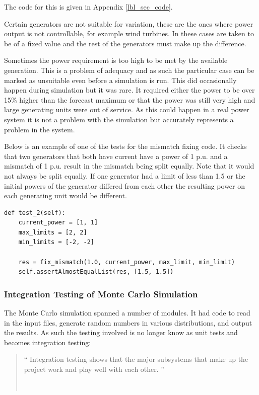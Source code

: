 \documentclass[a4paper,oneside,12pt]{report}
\newcommand{\tmpquotecite}{}%
\newenvironment{myquote}[1][]
{\renewcommand{\tmpquotecite}{#1}\begin{quote}\begin{itshape}``}
{''\end{itshape}~{\normalfont~\tmpquotecite}\end{quote}}
\begin{document}
The code for this is given in Appendix \ref{lbl_sec_code}.

Certain generators are not suitable for variation, these are the ones
where power output is not controllable, for example wind turbines. In
these cases are taken to be of a fixed value and the rest of the
generators must make up the difference.

Sometimes the power requirement is too high to be met by the available
generation. This is a problem of adequacy and as such the particular
case can be marked as unsuitable even before a simulation is run. This
did occasionally happen during simulation but it was rare. It required
either the power to be over 15\% higher than the forecast maximum or
that the power was still very high and large generating units were out
of service. As this could happen in a real power system it is not a
problem with the simulation but accurately represents a problem in the
system.

Below is an example of one of the tests for the mismatch fixing code. It
checks that two generators that both have current have a power of 1 p.u.
and a mismatch of 1 p.u. result in the mismatch being split equally.
Note that it would not always be split equally. If one generator had a
limit of less than 1.5 or the initial powers of the generator differed
from each other the resulting power on each generating unit would be
different.

\begin{verbatim}
def test_2(self):
    current_power = [1, 1]
    max_limits = [2, 2]
    min_limits = [-2, -2]

    res = fix_mismatch(1.0, current_power, max_limit, min_limit)
    self.assertAlmostEqualList(res, [1.5, 1.5])
\end{verbatim}

\subsubsection{Integration Testing of Monte Carlo Simulation}

The Monte Carlo simulation spanned a number of modules. It had code to
read in the input files, generate random numbers in various
distributions, and output the results. As such the testing involved is
no longer know as unit tests and becomes integration testing:

\begin{myquote}[\cite{Hunt2000}]
Integration testing shows that the major subsystems that make up the project work and play well with each other.
\end{myquote}
\end{document}
